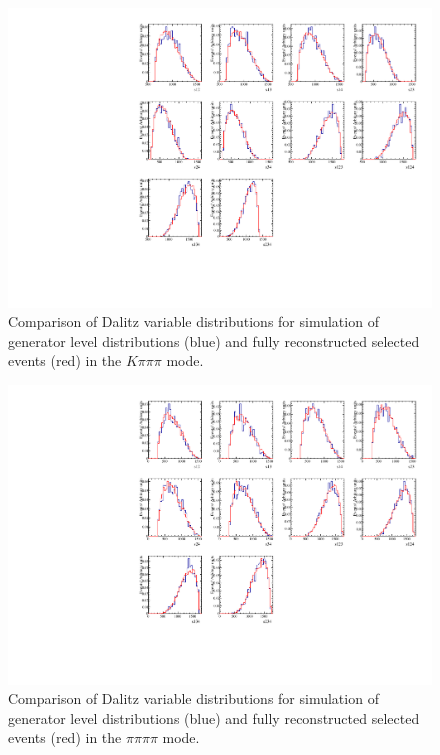 \begin{figure}
\includegraphics[width=\linewidth]{figures/results/dalitzDist_KPiPiPi.pdf}
\caption{Comparison of Dalitz variable distributions for simulation of generator level distributions (blue) and fully reconstructed selected events (red) in the $K\pi\pi\pi$ mode.}
\label{dalitzk3pi}
\end{figure}

\begin{figure}
\includegraphics[width=\linewidth]{figures/results/dalitzDist_PiPiPiPi.pdf}
\caption{Comparison of Dalitz variable distributions for simulation of generator level distributions (blue) and fully reconstructed selected events (red) in the $\pi\pi\pi\pi$ mode.}
\label{dalitz4pi}
\end{figure}


